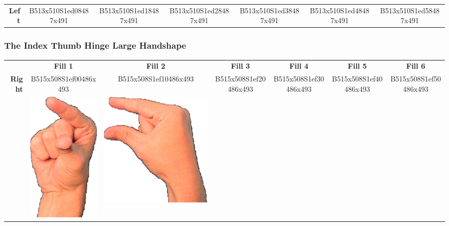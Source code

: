 \documentclass{article}
\begin{document}
\begin{center}
\begin{tabular}{r*{6}{c}}
\textbf{Left}&
B513x510S1ed08487x491&
B513x510S1ed18487x491&
B513x510S1ed28487x491&
B513x510S1ed38487x491&
B513x510S1ed48487x491&
B513x510S1ed58487x491\\
\end{tabular}
\end{center}

\subsubsection{The Index Thumb Hinge Large Handshape}

\begin{center}
\begin{tabular}{r*{6}{c}}
&\textbf{Fill 1}&\textbf{Fill 2}&\textbf{Fill 3}&\textbf{Fill 4}&\textbf{Fill 5}&\textbf{Fill 6}\\
\multirow{2}{*}{\textbf{Right}}&
B515x508S1ef00486x493&
B515x508S1ef10486x493&
B515x508S1ef20486x493&
B515x508S1ef30486x493&
B515x508S1ef40486x493&
B515x508S1ef50486x493\\
&
\includegraphics[scale=0.1]{images/09-12-1.jpg}&
\includegraphics[scale=0.1]{images/09-12-2.jpg}&

\end{tabular}
\end{center}
\end{document}
